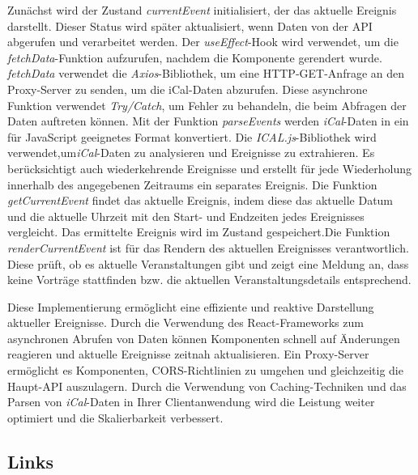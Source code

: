 Zunächst wird der Zustand \emph{currentEvent} initialisiert, der das aktuelle Ereignis darstellt. Dieser Status wird später aktualisiert, wenn Daten von der API abgerufen und verarbeitet werden. 
Der \emph{useEffect}-Hook wird verwendet, um die \emph{fetchData}-Funktion aufzurufen, nachdem die Komponente gerendert wurde. \emph{fetchData} verwendet die \emph{Axios}-Bibliothek, um eine HTTP-GET-Anfrage an den Proxy-Server zu senden, um die iCal-Daten abzurufen. Diese asynchrone Funktion verwendet \emph{Try/Catch}, um  Fehler zu behandeln, die beim Abfragen der Daten auftreten können. Mit der Funktion \emph{parseEvents} werden \emph{iCal}-Daten in ein für JavaScript geeignetes Format konvertiert. Die \emph{ICAL.js}-Bibliothek wird verwendet,um\emph{iCal}-Daten zu analysieren und  Ereignisse zu extrahieren. Es berücksichtigt auch wiederkehrende Ereignisse und erstellt  für jede Wiederholung innerhalb des angegebenen Zeitraums ein separates Ereignis. 
Die Funktion \emph{getCurrentEvent} findet das aktuelle Ereignis, indem diese das aktuelle Datum und die aktuelle Uhrzeit mit den Start- und Endzeiten jedes Ereignisses vergleicht. Das ermittelte Ereignis wird  im Zustand gespeichert.Die Funktion \emph{renderCurrentEvent} ist für das Rendern des aktuellen Ereignisses verantwortlich. Diese prüft, ob es aktuelle Veranstaltungen gibt und zeigt eine Meldung an, dass keine Vorträge stattfinden bzw. die aktuellen Veranstaltungsdetails entsprechend. 

Diese Implementierung ermöglicht eine effiziente und reaktive Darstellung aktueller Ereignisse. Durch die Verwendung des React-Frameworks zum asynchronen Abrufen von Daten können Komponenten schnell auf Änderungen reagieren und aktuelle Ereignisse zeitnah aktualisieren. Ein Proxy-Server ermöglicht es Komponenten, CORS-Richtlinien zu umgehen und gleichzeitig die  Haupt-API auszulagern. Durch die Verwendung von Caching-Techniken und das Parsen von \emph{iCal}-Daten in Ihrer Clientanwendung wird die Leistung weiter optimiert und die Skalierbarkeit verbessert.
\newpage
\subsection{Links}
